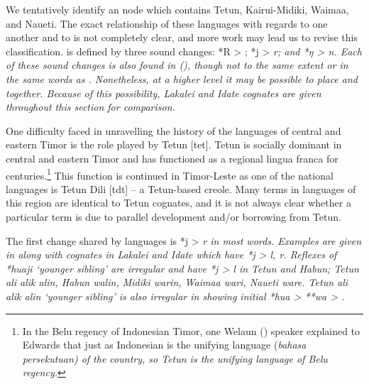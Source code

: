 \largerpage
{}
We tentatively identify an  node which contains
Tetun, Kairui-Midiki, Waima{\Q}a, and Naueti.
The exact relationship of these languages with regards to one
another and to  is not completely clear,
and more work may lead us to revise this classification.
 is defined by three sound changes: *R > {\0};
*j > \it{r}; and *ŋ > \it{n}.
Each of these sound changes is also found in 
(), though not to the same extent or in the same words as .
Nonetheless, at a higher level it may be possible to place  and  together.
Because of this possibility,
Lakalei and Idate cognates are given throughout this section for comparison.

\largerpage
One difficulty faced in unravelling the history of the languages
of central and eastern Timor is the role played by Tetun [tet].
Tetun is socially dominant in central
and eastern Timor and has functioned as a regional lingua franca
for centuries.\footnote{
		In the Belu regency of Indonesian Timor,
		one Welaun () speaker explained to Edwards that just
		as Indonesian is the unifying language (\it{bahasa persekutuan})
		of the country, so Tetun is the unifying language of Belu regency.}
This function
is continued in Timor-Leste as one of the national languages
is Tetun Dili [tdt] -- a Tetun-based creole.
Many terms in languages of this region are identical to Tetun
cognates, and it is not always clear whether a particular term is due to
parallel development and/or borrowing from Tetun.

The first change shared by  languages is *j
> \it{r} in most words.
Examples are given in  along with cognates in Lakalei
and Idate which have *j > \it{l}, \it{r}.
Reflexes of *huaji ‘younger sibling’ are irregular
and have *j > \it{l} in Tetun
and Habun; Tetun \it{ali {\tl} alik {\tl} alin},
Habun \it{walin}, Midiki \it{warin},
Waima{\Q}a \it{wari}, Naueti \it{ware}.
Tetun \it{ali {\tl} alik {\tl} alin} ‘younger sibling’ is also
irregular in showing initial *hua > **wa > {\0}.

